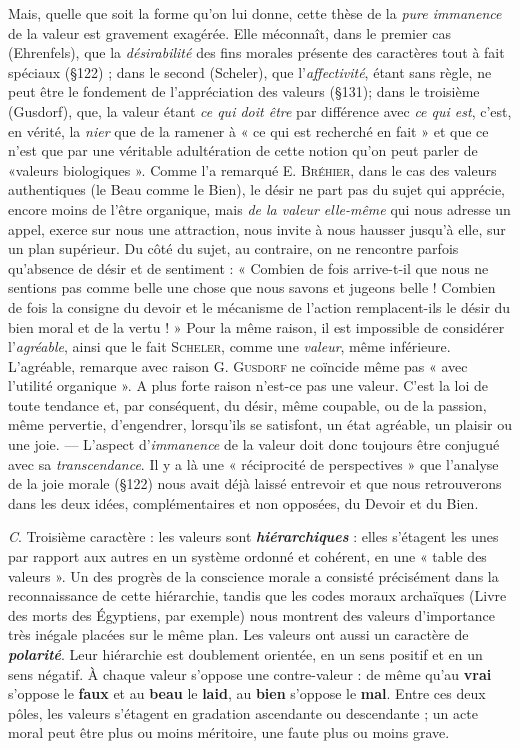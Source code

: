 Mais, quelle que soit la forme qu’on lui donne, cette thèse de la
{\it pure immanence} de la valeur est gravement exagérée. Elle méconnaît,
dans le premier cas (Ehrenfels), que la {\it désirabilité} des fins morales
présente des caractères tout à fait spéciaux (\S 122) ; dans le second
(Scheler), que l’{\it affectivité}, étant sans règle, ne peut être le fondement
de l'appréciation des valeurs (\S 131); dans le troisième (Gusdorf),
que, la valeur étant {\it ce qui doit être} par différence avec {\it ce qui est}, c’est,
en vérité, la {\it nier} que de la ramener à « ce qui est recherché en fait »
et que ce n’est que par une véritable adultération de cette notion
qu’on peut parler de «valeurs biologiques ». Comme l’a remarqué
E. \textsc{Bréhier}, dans le cas des valeurs authentiques (le Beau comme
le Bien), le désir ne part pas du sujet qui apprécie, encore moins
de l’être organique, mais {\it de la valeur elle-même} qui nous adresse
un appel, exerce sur nous une attraction, nous invite à nous hausser
jusqu’à elle, sur un plan supérieur. Du côté du sujet, au contraire,
on ne rencontre parfois qu’absence de désir et de sentiment : « Combien
de fois arrive-t-il que nous ne sentions pas comme belle une
chose que nous savons et jugeons belle ! Combien de fois la consigne du
devoir et le mécanisme de l’action remplacent-ils le désir du bien
moral et de la vertu ! » Pour la même raison, il est impossible de
considérer l’{\it agréable}, ainsi que le fait \textsc{Scheler}, comme une {\it valeur},
même inférieure. L’agréable, remarque avec raison G. \textsc{Gusdorf} ne
coïncide même pas « avec l'utilité organique ». A plus forte raison
n'est-ce pas une valeur. C’est la loi de toute tendance et, par conséquent,
du désir, même coupable, ou de la passion, même pervertie,
d’engendrer, lorsqu'ils se satisfont, un état agréable, un plaisir ou
une joie. — L'aspect d’{\it immanence} de la valeur doit donc toujours être
conjugué avec sa {\it transcendance}. Il y a là une « réciprocité de perspectives »
que l’analyse de la joie morale (\S 122) nous avait déjà
laissé entrevoir et que nous retrouverons dans les deux idées, complémentaires
et non opposées, du Devoir et du Bien.

{\it C}. Troisième caractère : les valeurs sont \textbf{\textit {hiérarchiques}} : elles
s’étagent les unes par rapport aux autres en un système ordonné et
cohérent, en une « table des valeurs ». Un des progrès de la conscience
morale a consisté précisément dans la reconnaissance de cette
hiérarchie, tandis que les codes moraux archaïques (Livre des morts des
Égyptiens, par exemple) nous montrent des valeurs d'importance
très inégale placées sur le même plan. Les valeurs ont aussi un caractère
de \textbf{\textit {polarité}}. Leur hiérarchie est doublement orientée, en un sens
positif et en un sens négatif. À chaque valeur s'oppose une
contre-valeur : de même qu’au {\bf vrai} s'oppose le {\bf faux} et au {\bf beau} le {\bf laid}, au {\bf bien}
s’oppose le {\bf mal}. Entre ces deux pôles, les valeurs s’étagent en
gradation ascendante ou descendante ; un acte moral peut être plus
ou moins méritoire, une faute plus ou moins grave.

